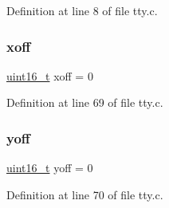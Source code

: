Definition at line 8 of file tty.\+c.

\mbox{\label{a00149_abaa0d20f0e52ce0d3a7d706f6ac16266_abaa0d20f0e52ce0d3a7d706f6ac16266}} 
\subsubsection{\texorpdfstring{xoff}{xoff}}
{\footnotesize\ttfamily \hyperlink{a00125_a273cf69d639a59973b6019625df33e30_a273cf69d639a59973b6019625df33e30}{uint16\+\_\+t} xoff = 0}



Definition at line 69 of file tty.\+c.

\mbox{\label{a00149_a1a7539764d0ae8cd06ce45c62cf92bca_a1a7539764d0ae8cd06ce45c62cf92bca}} 
\subsubsection{\texorpdfstring{yoff}{yoff}}
{\footnotesize\ttfamily \hyperlink{a00125_a273cf69d639a59973b6019625df33e30_a273cf69d639a59973b6019625df33e30}{uint16\+\_\+t} yoff = 0}



Definition at line 70 of file tty.\+c.

